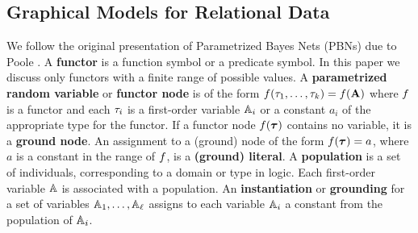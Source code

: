 \documentclass[twoside,leqno,twocolumn]{article}
\begin{document}
\subsection{Graphical Models for Relational Data} \label{sec:graph-relational}
We follow the original presentation of Parametrized Bayes Nets (PBNs) due to Poole \cite{Poole2003}. A \textbf{functor} is a function symbol or a predicate symbol. In this paper we discuss only  functors with a finite range of possible values. 
A \textbf{parametrized random variable} or \textbf{functor node} is  of the form $f(\tau_{1},\ldots,\tau_{k}) = f(\mathbf{A})$ where $f$ is a functor and each $\tau_{i}$ is a first-order variable $\mathbb{A}_{i}$ or a constant $a_{i}$ of the appropriate type for the functor.
If a functor node $f(\boldsymbol{\tau})$ contains no variable, it is a \textbf{ground node}. An assignment to a (ground) node of the form $f(\boldsymbol{\tau}) = a$, where $a$ is a constant in the range of $f$, is a \textbf{(ground) literal}.
A \textbf{population} is a set of individuals, corresponding to a domain or type in logic. Each first-order variable $\mathbb{A}$ is associated with a population.
 An \textbf{instantiation} or \textbf{grounding} 
 for a set of variables $\mathbb{A}_{1},\ldots,\mathbb{A}_{\ell}$ assigns to each variable $\mathbb{A}_{i}$ a constant 
 from the population of $\mathbb{A}_{i}$.
\end{document}
